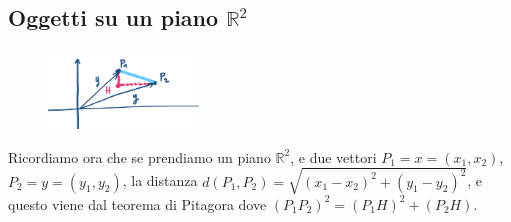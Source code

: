 \subsection{Oggetti su un piano $\mathbb{R}^2$}
\begin{figure}
    \vspace{-20pt}
    \centering
    \includegraphics[width=4cm]{images/piano_R2.png}
\end{figure}
Ricordiamo ora che se prendiamo un piano $\mathbb{R}^2$, e due vettori $P_1 = x = (x_1, x_2)$, $P_2 = y = (y_1, y_2)$, la distanza $d(P_1, P_2) = \sqrt{(x_1 - x_2)^2 + (y_1-y_2)^2}$, e questo viene dal teorema di Pitagora dove $(P_1P_2)^2 = (P_1H)^2 + (P_2H)$.

